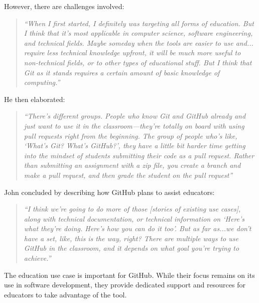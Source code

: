 However, there are challenges involved:
\begin{quote}\textit{``When I first started, I definitely was targeting all forms of education. But I think that it's most applicable in computer science, software engineering, and technical fields. Maybe someday when the tools are easier to use and... require less technical knowledge upfront, it will be much more useful to non-technical fields, or to other types of educational stuff. But I think that Git as it stands requires a certain amount of basic knowledge of computing.''}\end{quote}

He then elaborated:
\begin{quote}\textit{``There's different groups. People who know Git and GitHub already and just want to use it in the classroom---they're totally on board with using pull requests right from the beginning. The group of people who's like, `What's Git? What's GitHub?', they have a little bit harder time getting into the mindset of students submitting their code as a pull request. Rather than submitting an assignment with a zip file, you create a branch and make a pull request, and then grade the student on the pull request''}\end{quote}

John concluded by describing how GitHub plans to assist educators:
\begin{quote}\textit{``I think we're going to do more of those [stories of existing use cases], along with technical documentation, or technical information on `Here's what they're doing. Here's how you can do it too'. But as far as...we don't have a set, like, this is the way, right? There are multiple ways to use GitHub in the classroom, and it depends on what goal you're trying to achieve.''}\end{quote}

The education use case is important for GitHub. While their focus remains on its use in software development, they provide dedicated support and resources for educators to take advantage of the tool.

